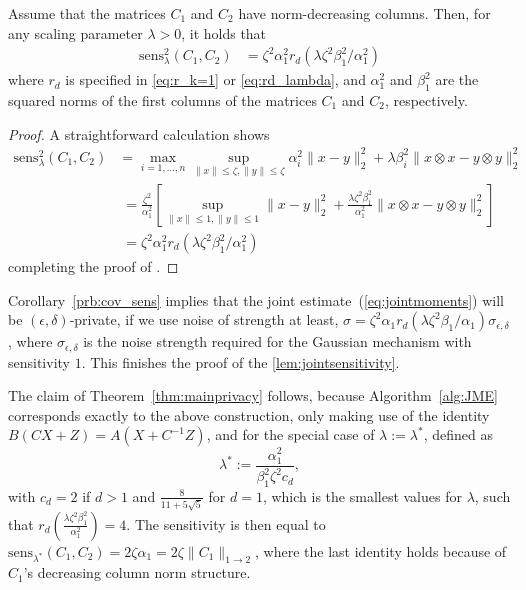 \begin{corollary}
\label{cor:dif_mat}
Assume that the matrices $C_1$ and $C_2$ have norm-decreasing columns. Then,
for any scaling parameter $\lambda > 0$, it holds that 
\begin{align}
     \text{sens}_{\lambda}^2(C_1, C_2) &= \zeta^2\alpha^2_1 r_d(\lambda \zeta^2 \beta^2_1/\alpha^2_1) 
     \label{eq:sens_from_rd}
\end{align}
where $r_d$ is specified in \eqref{eq:r_k=1} or \eqref{eq:rd_lambda}, 
and $\alpha^2_1$ and $\beta^2_1$ are the squared norms of the first columns of the matrices $C_1$ and $C_2$,
respectively. %
\end{corollary}
\begin{proof}
A straightforward calculation shows 
\begin{align*}
\text{sens}_{\lambda}^2(C_1, C_2) &=\max_{i=1, \dots, n} \sup_{\|x\| \le \zeta, \|y\| \le \zeta} \alpha^2_i \|x - y\|_2^2 + \lambda \beta^2_i \|x \otimes x - y \otimes y\|_2^2\\
    &\;=  \frac{\zeta^2}{\alpha^2_1} \left[\sup_{\|x\| \le 1, \|y\| \le 1} \|x - y\|_2^2 + \frac{\lambda\zeta^2 \beta^2_1}{\alpha^2_1}\|x \otimes x - y \otimes y\|_2^2\right]\\
    &\;= \zeta^2\alpha^2_1 r_d(\lambda \zeta^2 \beta^2_1/\alpha^2_1) 
\end{align*}
completing the proof of .
\end{proof}



Corollary~\ref{prb:cov_sens} implies that the joint estimate~(\ref{eq:jointmoments}) 
will be $(\epsilon,\delta)$-private, if we use noise of strength at least, 
$\sigma=\zeta^2\alpha_1 r_d(\lambda \zeta^2 \beta_1/\alpha_1)\sigma_{\epsilon,\delta}$, 
where $\sigma_{\epsilon,\delta}$ is the noise strength required for the Gaussian mechanism 
with sensitivity $1$. This finishes the proof of the \cref{lem:jointsensitivity}.

The claim of Theorem~\ref{thm:mainprivacy} follows, because Algorithm~\ref{alg:JME} 
corresponds exactly to the above construction, only making use of the 
identity $B(CX+Z) = A(X+C^{-1}Z)$, and for the special case of $\lambda:=\lambda^{*}$, defined as 
\begin{equation}
    \label{def:crit_lambda}
    \lambda^{*} := \frac{\alpha^2_1}{\beta^2_1 \zeta^2 c_d},
\end{equation}
with $c_d = 2$ if $d > 1$ and $\frac{8}{11 + 5\sqrt{5}}$ for $d = 1$,
%
which is the smallest values for $\lambda$, such that $r_d\left(\frac{\lambda \zeta^2 \beta^2_1}{\alpha^2_1}\right) = 4$. 
%
The sensitivity is then equal to $\text{sens}_{\lambda^*}(C_1, C_2) = 2\zeta \alpha_1 = 2\zeta \|C_1\|_{1 \to 2}$, where the last identity holds because of $C_1$'s decreasing column norm structure.

